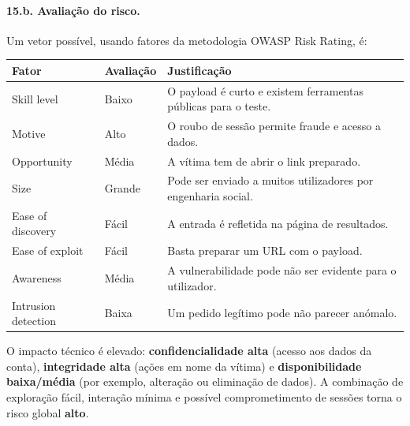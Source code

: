 \documentclass[11pt,a4paper]{article}
\begin{document}
\paragraph{15.b. Avaliação do risco.}
Um vetor possível, usando fatores da metodologia OWASP Risk Rating, é:

\begin{center}
\begin{tabularx}{\textwidth}{@{}l l L@{}}
\toprule
\textbf{Fator} & \textbf{Avaliação} & \textbf{Justificação} \\
\midrule
Skill level & Baixo & O payload é curto e existem ferramentas públicas para o teste. \\
Motive & Alto & O roubo de sessão permite fraude e acesso a dados. \\
Opportunity & Média & A vítima tem de abrir o link preparado. \\
Size & Grande & Pode ser enviado a muitos utilizadores por engenharia social. \\
Ease of discovery & Fácil & A entrada é refletida na página de resultados. \\
Ease of exploit & Fácil & Basta preparar um URL com o payload. \\
Awareness & Média & A vulnerabilidade pode não ser evidente para o utilizador. \\
Intrusion detection & Baixa & Um pedido legítimo pode não parecer anómalo. \\
\bottomrule
\end{tabularx}
\end{center}

O impacto técnico é elevado: \textbf{confidencialidade alta} (acesso aos dados da conta),
\textbf{integridade alta} (ações em nome da vítima) e \textbf{disponibilidade baixa/média} (por
exemplo, alteração ou eliminação de dados). A combinação de exploração fácil, interação mínima e
possível comprometimento de sessões torna o risco global \textbf{alto}.
\end{document}
